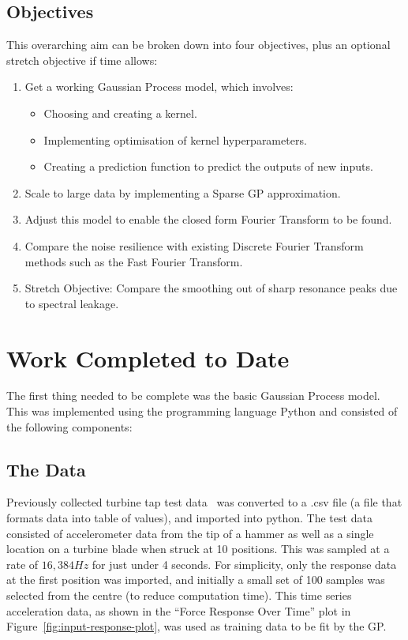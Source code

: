 \documentclass[12pt]{article}
\begin{document}
    \subsection{Objectives}
    This overarching aim can be broken down into four objectives, plus an optional stretch objective if time allows:
        \begin{enumerate}
            \item Get a working Gaussian Process model, which involves:
                \begin{itemize}
                    \item Choosing and creating a kernel.
                    \item Implementing optimisation of kernel hyperparameters. \label{item:nll}
                    \item Creating a prediction function to predict the outputs of new inputs. \label{item:predict}
                \end{itemize}
            \item Scale to large data by implementing a Sparse GP approximation.
            \item Adjust this model to enable the closed form Fourier Transform to be found.
            \item Compare the noise resilience with existing Discrete Fourier Transform methods such as the Fast Fourier Transform.\label{noise-resilience}
            \item Stretch Objective: Compare the smoothing out of sharp resonance peaks due to spectral leakage.\label{stretch-obj}
        \end{enumerate}

    \section{Work Completed to Date}
    The first thing needed to be complete was the basic Gaussian Process model.
    This was implemented using the programming language Python and consisted of the following components:
    \subsection{The Data}
    Previously collected turbine tap test data~\cite{MEC326} was converted to a .csv file (a file that formats data into table of values), and imported into python.
    The test data consisted of accelerometer data from the tip of a hammer as well as a single location on a turbine blade when struck at 10 positions.
    This was sampled at a rate of $16,384 Hz$ for just under 4 seconds.
    For simplicity, only the response data at the first position was imported, and initially a small set of 100 samples was selected from the centre (to reduce computation time).
    This time series acceleration data, as shown in the ``Force Response Over Time'' plot in Figure~\ref{fig:input-response-plot}, was used as training data to be fit by the GP\@.
\end{document}
